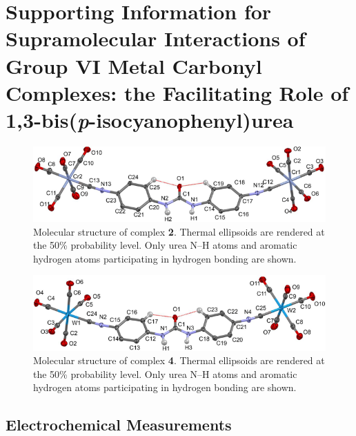 \chapter{Supporting Information for Supramolecular Interactions of Group VI Metal Carbonyl Complexes: the Facilitating Role of 1,3-bis(\textit{p}-isocyanophenyl)urea}
\label{chap:supra_SI}

\newpage %

\begin{figure}
    \centering
    \includegraphics[width=0.8\linewidth]{figures/pub2/si_fig1.png}
    \caption{Molecular structure of complex \textbf{2}. Thermal ellipsoids are rendered at the 50\% probability level. Only urea N–H atoms and aromatic hydrogen atoms participating in hydrogen bonding are shown.}\label{fig:complex2}
\end{figure}

\begin{figure}
    \centering
    \includegraphics[width=0.8\linewidth]{figures/pub2/si_fig2.png}
    \caption{Molecular structure of complex \textbf{4}. Thermal ellipsoids are rendered at the 50\% probability level. Only urea N–H atoms and aromatic hydrogen atoms participating in hydrogen bonding are shown.}\label{fig:complex4}
\end{figure}

\section{Electrochemical Measurements}

